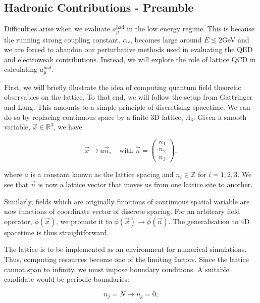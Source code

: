\documentclass{article}
\numberwithin{equation}{section} %
\begin{document}
\subsection{Hadronic Contributions - Preamble}\label{had preamble}

Difficulties arise when we evaluate $a_\mu^\mathrm{had}$ in the low energy regime. This is because the running strong coupling constant, $\alpha_s$, becomes large around $E\lesssim2$GeV\cite{lehnerg2} and we are forced to abandon our perturbative methods used in evaluating the QED and electroweak contributions. Instead, we will explore the role of lattice QCD in calculating $a_\mu^\mathrm{had}$. 

First, we will briefly illustrate the idea of computing quantum field theoretic observables on the lattice. To that end, we will follow the setup from Gattringer and Lang\cite{lattice}. This amounts to a simple principle of discretising spacetime. We can do so by replacing continuous space by a finite 3D lattice, $\Lambda_3$. Given a smooth variable, $\vec{x}\in\mathbb{R}^3$, we have

\begin{equation}
\vec{x} \rightarrow a \vec{n}, \quad \mathrm{with } \, \, \vec{n} = \begin{pmatrix}
n_1 \\ n_2 \\ n_3
\end{pmatrix},
\end{equation}

\noindent where $a$ is a constant known as the lattice spacing and $n_i\in\mathbb{Z}$ for $i=1,2,3$. We see that $\vec{n}$ is now a lattice vector that moves us from one lattice site to another. 

Similarly, fields which are originally functions of continuous spatial variable are now functions of coordinate vector of discrete spacing. For an arbitrary field operator, $\phi(\vec{x})$, we promote it to $\phi(\vec{x}) \rightarrow \phi(\vec{n})$. The generalisation to 4D spacetime is thus straightforward.

The lattice is to be implemented as an environment for numerical simulations. Thus, computing resources become one of the limiting factors. Since the lattice cannot span to infinity, we must impose boundary conditions. A suitable candidate would be periodic boundaries:

\begin{equation}
n_j=N \rightarrow n_j=0,
\end{equation}
\end{document}
